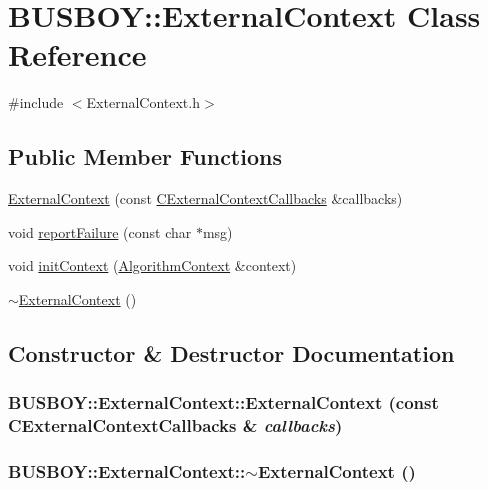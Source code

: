 \hypertarget{classBUSBOY_1_1ExternalContext}{
\section{BUSBOY::ExternalContext Class Reference}
\label{classBUSBOY_1_1ExternalContext}
}


{\ttfamily \#include $<$ExternalContext.h$>$}\subsection*{Public Member Functions}
\begin{DoxyCompactItemize}
\item 
\hyperlink{classBUSBOY_1_1ExternalContext_a0633e71b28c3a48f4a25d4a43201ec88}{ExternalContext} (const \hyperlink{structCExternalContextCallbacksStruct}{CExternalContextCallbacks} \&callbacks)
\item 
void \hyperlink{classBUSBOY_1_1ExternalContext_a5f70d1baeba3e1de1b9fb089ebafd6d0}{reportFailure} (const char $\ast$msg)
\item 
void \hyperlink{classBUSBOY_1_1ExternalContext_a2d7098419637591cd82f44c7c4bed1e5}{initContext} (\hyperlink{classBUSBOY_1_1AlgorithmContext}{AlgorithmContext} \&context)
\item 
\hyperlink{classBUSBOY_1_1ExternalContext_a6d8b33195406bb92a187958802c83d73}{$\sim$ExternalContext} ()
\end{DoxyCompactItemize}


\subsection{Constructor \& Destructor Documentation}
\hypertarget{classBUSBOY_1_1ExternalContext_a0633e71b28c3a48f4a25d4a43201ec88}{
\subsubsection[{ExternalContext}]{\setlength{\rightskip}{0pt plus 5cm}BUSBOY::ExternalContext::ExternalContext (const {\bf CExternalContextCallbacks} \& {\em callbacks})}}
\label{classBUSBOY_1_1ExternalContext_a0633e71b28c3a48f4a25d4a43201ec88}
\hypertarget{classBUSBOY_1_1ExternalContext_a6d8b33195406bb92a187958802c83d73}{
\subsubsection[{$\sim$ExternalContext}]{\setlength{\rightskip}{0pt plus 5cm}BUSBOY::ExternalContext::$\sim$ExternalContext ()}}
\label{classBUSBOY_1_1ExternalContext_a6d8b33195406bb92a187958802c83d73}


